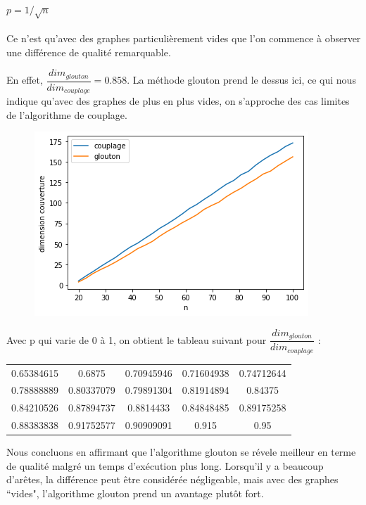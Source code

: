 \documentclass[12pt]{article}
\begin{document}
\begin{enumerate}
                \paragraph{$p = 1/ \sqrt{n}$}
                    Ce n'est qu'avec des graphes particulièrement vides que l'on commence à observer une différence de qualité remarquable.

                    En effet, $\dfrac{dim_{glouton}}{dim_{couplage}} = 0.858 $.
                    La méthode glouton prend le dessus ici, ce qui nous indique qu'avec des graphes de plus en plus vides, on s'approche des cas limites de l'algorithme de couplage.

                    \begin{figure}[H]
                        \includegraphics[scale=0.5]{figures/qualite_p.png}
                        \centering
                    \end{figure}

                Avec p qui varie de 0 à 1, on obtient le tableau suivant pour $\dfrac{dim_{glouton}}{dim_{couplage}}$ :

                \begin{center}
                    \begin{tabular}{ |c c c c c| } 
                    \hline
                    0.65384615 & 0.6875 &    0.70945946  & 0.71604938 & 0.74712644  \\
                    0.78888889 & 0.80337079 & 0.79891304 & 0.81914894 & 0.84375   \\
                    0.84210526  & 0.87894737 & 0.8814433 & 0.84848485 & 0.89175258 \\
                    0.88383838 &  0.91752577 & 0.90909091 & 0.915   &    0.95\\
                    \hline
                    \end{tabular}
                \end{center}

                Nous concluons en affirmant que l'algorithme glouton se révele meilleur en terme de qualité malgré un temps d'exécution plus long.
                Lorsqu'il y a beaucoup d'arêtes, la différence peut être considérée négligeable, mais avec des graphes ``vides", l'algorithme glouton prend un avantage plutôt fort.

        \end{enumerate}
\end{document}
